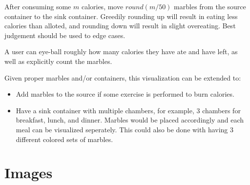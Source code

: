 \documentclass{article}
\begin{document}
After consuming some $m$ calories, move $round(m/50)$ marbles from the source container to the sink container. Greedily rounding up will result in eating less calories than alloted, and rounding down will result in slight overeating. Best judgement should be used to edge cases. 

A user can eye-ball roughly how many calories they have ate and have left, as well as explicitly count the marbles. 

Given proper marbles and/or containers, this visualization can be extended to:

\begin{itemize}
\item Add marbles to the source if some exercise is performed to burn calories.
\item Have a sink container with multiple chambers, for example, 3 chambers for breakfast, lunch, and dinner. Marbles would be placed accordingly and each meal can be visualized seperately. This could also be done with having 3 different colored sets of marbles. 
\end{itemize} 

\pagebreak

\section{Images}
\end{document}
